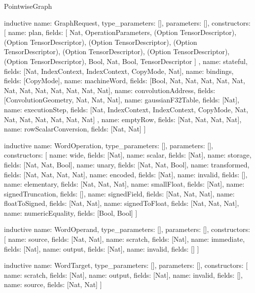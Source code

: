 \begin{lexlean}{PointwiseGraph}
\begin{semanticmodule}
inductive{
  name: GraphRequest,
  type_parameters: [],
  parameters: [],
  constructors: [
    {
      name: plan,
      fields: [
        Nat,
        OperationParameters,
        (Option TensorDescriptor),
        (Option TensorDescriptor),
        (Option TensorDescriptor),
        (Option TensorDescriptor),
        (Option TensorDescriptor),
        (Option TensorDescriptor),
        (Option TensorDescriptor),
        Bool,
        Nat,
        Bool,
        TensorDescriptor
      ]
    },
    {name: stateful, fields: [Nat, IndexContext, IndexContext, CopyMode, Nat]},
    {name: bindings, fields: [CopyMode]},
    {name: machineWord, fields: [Bool, Nat, Nat, Nat, Nat, Nat, Nat, Nat, Nat, Nat, Nat, Nat, Nat]},
    {name: convolutionAddress, fields: [ConvolutionGeometry, Nat, Nat, Nat]},
    {name: gaussianF32Table, fields: [Nat]},
    {
      name: executionStep,
      fields: [Nat, IndexContext, IndexContext, CopyMode, Nat, Nat, Nat, Nat, Nat, Nat, Nat]
    },
    {name: emptyRow, fields: [Nat, Nat, Nat, Nat]},
    {name: rowScalarConversion, fields: [Nat, Nat]}
  ]
}

inductive{
  name: WordOperation,
  type_parameters: [],
  parameters: [],
  constructors: [
    {name: wide, fields: [Nat]},
    {name: scalar, fields: [Nat]},
    {name: storage, fields: [Nat, Nat, Bool]},
    {name: unary, fields: [Nat, Nat, Bool]},
    {name: transformed, fields: [Nat, Nat, Nat, Nat]},
    {name: encoded, fields: [Nat]},
    {name: invalid, fields: []},
    {name: elementary, fields: [Nat, Nat, Nat]},
    {name: smallFloat, fields: [Nat]},
    {name: signedTruncation, fields: []},
    {name: signedField, fields: [Nat, Nat, Nat]},
    {name: floatToSigned, fields: [Nat, Nat]},
    {name: signedToFloat, fields: [Nat, Nat, Nat]},
    {name: numericEquality, fields: [Bool, Bool]}
  ]
}

inductive{
  name: WordOperand,
  type_parameters: [],
  parameters: [],
  constructors: [
    {name: source, fields: [Nat, Nat]},
    {name: scratch, fields: [Nat]},
    {name: immediate, fields: [Nat]},
    {name: output, fields: [Nat]},
    {name: invalid, fields: []}
  ]
}

inductive{
  name: WordTarget,
  type_parameters: [],
  parameters: [],
  constructors: [
    {name: scratch, fields: [Nat]},
    {name: output, fields: [Nat]},
    {name: invalid, fields: []},
    {name: source, fields: [Nat, Nat]}
  ]
}


\end{semanticmodule}
\end{lexlean}
